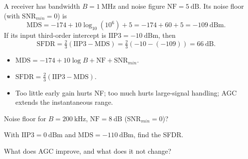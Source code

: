 \begin{workedexample}
A receiver has bandwidth $B = 1\ \text{MHz}$ and noise figure
$\text{NF} = 5\ \text{dB}$. Its noise floor (with $\text{SNR}_{min}=0$) is
\[ \text{MDS} = -174 + 10\log_{10}(10^6) + 5 = -174 + 60 + 5 = -109\ \text{dBm}. \]
If its input third-order intercept is $\text{IIP3} = -10\ \text{dBm}$, then
\[ \text{SFDR} = \tfrac{2}{3}(\text{IIP3} - \text{MDS}) = \tfrac{2}{3}(-10 - (-109)) = 66\ \text{dB}. \]
\end{workedexample}

\begin{keytakeaways}
\begin{itemize}[leftmargin=1.4em,itemsep=2pt]
\item $\text{MDS} = -174 + 10\log B + \text{NF} + \text{SNR}_{min}$.
\item $\text{SFDR} = \tfrac{2}{3}(\text{IIP3} - \text{MDS})$.
\item Too little early gain hurts NF; too much hurts large-signal handling; AGC extends the instantaneous range.
\end{itemize}
\end{keytakeaways}

\begin{exercises}
\item Noise floor for $B = 200\ \text{kHz}$, $\text{NF} = 8\ \text{dB}$ (SNR$_{min}=0$)?
\item With $\text{IIP3} = 0\ \text{dBm}$ and $\text{MDS} = -110\ \text{dBm}$, find the SFDR.
\item What does AGC improve, and what does it not change?
\end{exercises}

